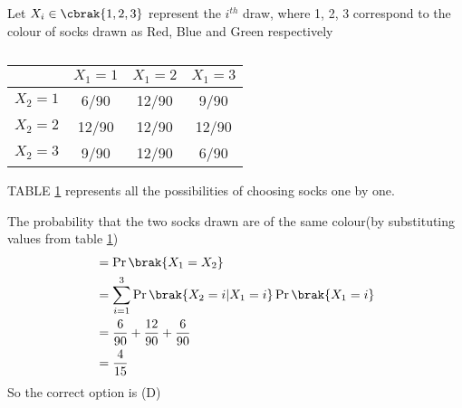 Let $X_i \in \cbrak{1, 2, 3}$ represent the $i^{th}$ draw, where 1, 2, 3 correspond to the colour of socks drawn as Red, Blue and Green respectively
\begin{table}[ht]
\centering 
\caption{}
\begin{tabular}{|c|c|c|c|}
\hline
           & $X_1 = 1$ & $X_1 = 2$ & $X_1 = 3$\\
\hline
$X_2 = 1$  & 6/90      & 12/90     & 9/90  \\
\hline
$X_2 = 2$  & 12/90      & 12/90    & 12/90  \\
\hline
$X_2 = 3$  & 9/90      & 12/90    & 6/90  \\
\hline
\end{tabular}
\label{table}
\end{table}
  
TABLE  \ref{table} represents all the possibilities of choosing socks one by one.
  
 
The probability that the two socks drawn are of the same colour(by substituting values from table \ref{table})
 \begin{align}
     &= \Pr\brak{X_1 = X_2} \\
     &= \sum_{i = 1}^3 \Pr\brak{X_2 = i | X_1 = i}\Pr\brak{X_1 = i}\\
     &= \dfrac{6}{90} +\dfrac{12}{90} + \dfrac{6}{90}\\
     &= \dfrac{4}{15}
 \end{align}
 So the correct option is (D)